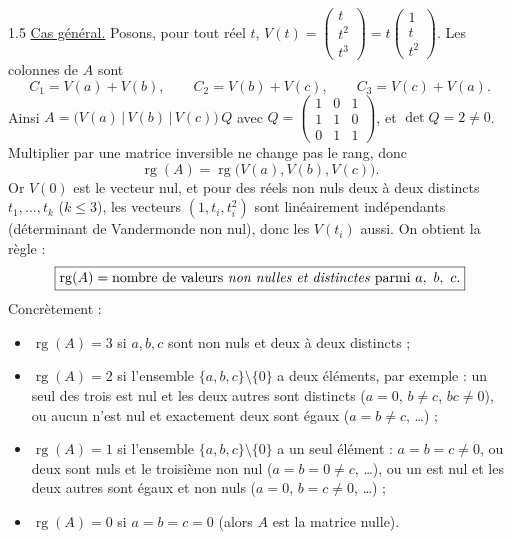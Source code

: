 \documentclass[12pt]{article}
\begin{document}
\begin{spacing}{1.5}
\underline{Cas général.} Posons, pour tout réel $t$, $V(t)=\begin{pmatrix}t\\t^2\\t^3\end{pmatrix}=t\begin{pmatrix}1\\t\\t^2\end{pmatrix}$. Les colonnes de $A$ sont
\[
C_1=V(a)+V(b),\qquad C_2=V(b)+V(c),\qquad C_3=V(c)+V(a).
\]
Ainsi $A=\big(V(a)\,|\,V(b)\,|\,V(c)\big)\,Q$ avec $Q=\begin{pmatrix}1&0&1\\1&1&0\\0&1&1\end{pmatrix}$, et $\det Q=2\neq0$. Multiplier par une matrice inversible ne change pas le rang, donc
\[
\operatorname{rg}(A)=\operatorname{rg}\big(V(a),V(b),V(c)\big).
\]
Or $V(0)$ est le vecteur nul, et pour des réels non nuls deux à deux distincts $t_1,\dots,t_k$ ($k\le 3$), les vecteurs $(1,t_i,t_i^2)$ sont linéairement indépendants (déterminant de Vandermonde non nul), donc les $V(t_i)$ aussi. On obtient la règle :
\[
\boxed{\operatorname{rg}(A)=\text{nombre de valeurs \emph{non nulles et distinctes} parmi } a,\ b,\ c.}
\]
Concrètement :
\begin{itemize}
\item $\operatorname{rg}(A)=3$ si $a,b,c$ sont non nuls et deux à deux distincts ;
\item $\operatorname{rg}(A)=2$ si l'ensemble $\{a,b,c\}\setminus\{0\}$ a deux éléments, par exemple : un seul des trois est nul et les deux autres sont distincts ($a=0$, $b\neq c$, $bc\neq0$), ou aucun n'est nul et exactement deux sont égaux ($a=b\neq c$, \dots) ;
\item $\operatorname{rg}(A)=1$ si l'ensemble $\{a,b,c\}\setminus\{0\}$ a un seul élément : $a=b=c\neq0$, ou deux sont nuls et le troisième non nul ($a=b=0\neq c$, \dots), ou un est nul et les deux autres sont égaux et non nuls ($a=0$, $b=c\neq0$, \dots) ;
\item $\operatorname{rg}(A)=0$ si $a=b=c=0$ (alors $A$ est la matrice nulle).
\end{itemize}


\end{spacing}
\end{document}
